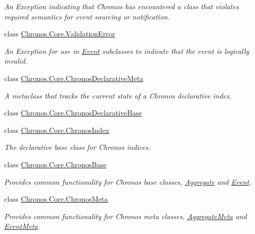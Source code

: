 \begin{DoxyCompactItemize}
\begin{DoxyCompactList}\small\item\em An Exception indicating that Chronos has encountered a class that violates required semantics for event sourcing or notification. \end{DoxyCompactList}\item 
class \hyperlink{classChronos_1_1Core_1_1ValidationError}{Chronos.\+Core.\+Validation\+Error}
\begin{DoxyCompactList}\small\item\em An Exception for use in \hyperlink{classChronos_1_1Core_1_1Event}{Event} subclasses to indicate that the event is logically invalid. \end{DoxyCompactList}\item 
class \hyperlink{classChronos_1_1Core_1_1ChronosDeclarativeMeta}{Chronos.\+Core.\+Chronos\+Declarative\+Meta}
\begin{DoxyCompactList}\small\item\em A metaclass that tracks the current state of a Chronos declarative index. \end{DoxyCompactList}\item 
class \hyperlink{classChronos_1_1Core_1_1ChronosDeclarativeBase}{Chronos.\+Core.\+Chronos\+Declarative\+Base}
\item 
class \hyperlink{classChronos_1_1Core_1_1ChronosIndex}{Chronos.\+Core.\+Chronos\+Index}
\begin{DoxyCompactList}\small\item\em The declarative base class for Chronos indices. \end{DoxyCompactList}\item 
class \hyperlink{classChronos_1_1Core_1_1ChronosBase}{Chronos.\+Core.\+Chronos\+Base}
\begin{DoxyCompactList}\small\item\em Provides common functionality for Chronos base classes, \hyperlink{classChronos_1_1Core_1_1Aggregate}{Aggregate} and \hyperlink{classChronos_1_1Core_1_1Event}{Event}. \end{DoxyCompactList}\item 
class \hyperlink{classChronos_1_1Core_1_1ChronosMeta}{Chronos.\+Core.\+Chronos\+Meta}
\begin{DoxyCompactList}\small\item\em Provides common functionality for Chronos meta classes, \hyperlink{classChronos_1_1Core_1_1AggregateMeta}{Aggregate\+Meta} and \hyperlink{classChronos_1_1Core_1_1EventMeta}{Event\+Meta}. \end{DoxyCompactList}\item 

\end{DoxyCompactItemize}
